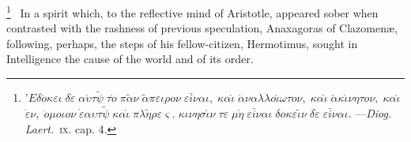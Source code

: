 \documentclass[oneside]{book}
\begin{document}
\footnote{'$E\delta\acute{o}\kappa\varepsilon\iota\; \delta\grave{\varepsilon}\; \alpha\acute{\upsilon}\tau\tilde{\psi}\; \tau\grave{o}\; \pi\tilde{\alpha}\nu\; \tilde{\alpha}\pi\varepsilon\iota\rho{o}\nu\; \varepsilon\bar{i}\nu\alpha\iota,\; \kappa\alpha\grave{\iota}\; \acute{\alpha}\nu\alpha\lambda\lambda{o}\acute{\iota}\omega\tau{o}%
\nu,\; \kappa\alpha\grave{\iota}\; \acute{\alpha}\kappa\acute{\iota}\nu\eta\tau{o}\nu,\; \kappa\alpha\grave{\iota}$
%
 $\ddot{\varepsilon}\nu,\; \ddot{o}\mu{o}\iota{o}\nu\; \grave{\varepsilon}\alpha\upsilon\tau\tilde{\psi}\; \kappa\alpha\grave{\iota}\; \pi\lambda\tilde{\eta}\rho\varepsilon\varsigma.\; \kappa\iota\nu\eta\sigma\acute{\iota}\nu\; \tau\varepsilon\; \mu\grave{\eta}\; \varepsilon\bar{i}\nu\alpha\iota\;
 \delta{o}\kappa\varepsilon\tilde{\iota}\nu\; \delta\grave{\varepsilon}\; \varepsilon\bar{i}\nu\alpha\iota.$
---\textit{Diog. Laert.}~\textsc{ix.}
cap. 4.
}%
\ In a spirit which, to the
reflective mind of Aristotle, appeared sober when contrasted
with the rashness of previous speculation, Anaxagoras of Clazomen{\ae}, following, perhaps, the steps of his fellow-citizen, Hermotimus, sought in Intelligence the cause of the world and of its
order.%
\end{document}
